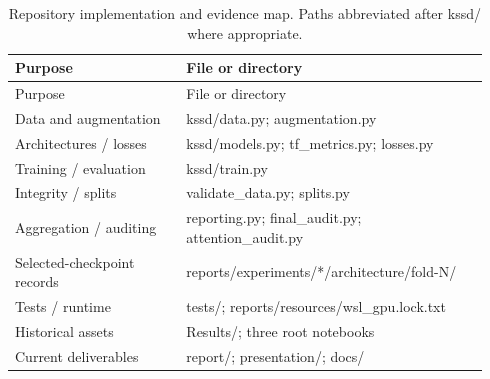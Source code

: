 \small
\begin{longtable}{p{0.34\linewidth}p{0.60\linewidth}}
\caption{Repository implementation and evidence map. Paths abbreviated after kssd/ where appropriate.}\\
\toprule
Purpose & File or directory\\\midrule
\endfirsthead
\toprule
Purpose & File or directory\\\midrule
\endhead
Data and augmentation & kssd/data.py; augmentation.py\\
Architectures / losses & kssd/models.py; tf\_metrics.py; losses.py\\
Training / evaluation & kssd/train.py\\
Integrity / splits & validate\_data.py; splits.py\\
Aggregation / auditing & reporting.py; final\_audit.py; attention\_audit.py\\
Selected-checkpoint records & reports/experiments/*/architecture/fold-N/\\
Tests / runtime & tests/; reports/resources/wsl\_gpu.lock.txt\\
Historical assets & Results/; three root notebooks\\
Current deliverables & report/; presentation/; docs/\\
\bottomrule\end{longtable}\normalsize
